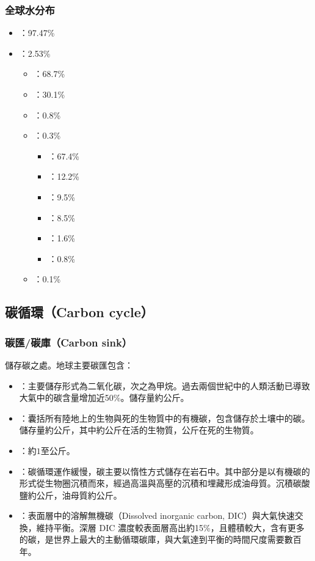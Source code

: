 \documentclass[a4paper,12pt]{report}
\begin{document}
\begin{itemize}
\subsubsection{全球水分布}
\begin{itemize}
\item {}：97.47\%
\item {}：2.53\%
\begin{itemize}
\item {}：68.7\%
\item {}：30.1\%
\item {}：0.8\%
\item {}：0.3\%
\begin{itemize}
\item {}：67.4\%
\item {}：12.2\%
\item {}：9.5\%
\item {}：8.5\%
\item {}：1.6\%
\item {}：0.8\%
\end{itemize}
\item {}：0.1\%
\end{itemize}
\end{itemize}
\subsection{碳循環（Carbon cycle）}
\bct\bfH\ctr{}\ef\FB\ect
\subsubsection{碳匯/碳庫（Carbon sink）}
儲存碳之處。地球主要碳匯包含：
\begin{itemize}
\item {}：主要儲存形式為二氧化碳，次之為甲烷。過去兩個世紀中的人類活動已導致大氣中的碳含量增加近50\%。儲存量約公斤。
\item {}：囊括所有陸地上的生物與死的生物質中的有機碳，包含儲存於土壤中的碳。儲存量約公斤，其中約公斤在活的生物質，公斤在死的生物質。
\item {}：約$1$至公斤。
\item {}：碳循環運作緩慢，碳主要以惰性方式儲存在岩石中。其中部分是以有機碳的形式從生物圈沉積而來，經過高溫與高壓的沉積和埋藏形成油母質。沉積碳酸鹽約公斤，油母質約公斤。
\item {}：表面層中的溶解無機碳（Dissolved inorganic carbon, DIC）與大氣快速交換，維持平衡。深層 DIC 濃度較表面層高出約15\%，且體積較大，含有更多的碳，是世界上最大的主動循環碳庫，與大氣達到平衡的時間尺度需要數百年。
\end{itemize}

\end{itemize}
\end{document}
